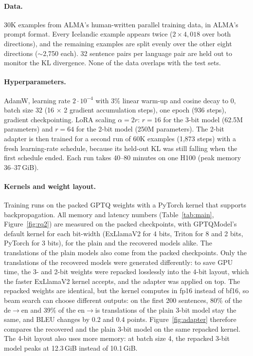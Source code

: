 \documentclass[10pt]{article}
\begin{document}
\paragraph{Data.} 30K examples from ALMA's human-written parallel training data,
in ALMA's prompt format. Every Icelandic example appears twice ($2\times4{,}018$
over both directions), and the remaining examples are split evenly over the
other eight directions ($\sim$2{,}750 each). 32 sentence pairs per language pair
are held out to monitor the KL divergence. None of the data overlaps with the
test sets.

\paragraph{Hyperparameters.} AdamW, learning rate $2\cdot10^{-4}$ with 3\%
linear warm-up and cosine decay to 0, batch size 32 (16 $\times$ 2 gradient
accumulation steps), one epoch (936 steps), gradient checkpointing. LoRA scaling
$\alpha=2r$: $r=16$ for the 3-bit model (62.5M parameters) and $r=64$ for the
2-bit model (250M parameters). The 2-bit adapter is then trained for a second
run of 60K examples (1{,}873 steps) with a fresh learning-rate schedule, because
its held-out KL was still falling when the first schedule ended. Each run takes
40--80 minutes on one H100 (peak memory 36--37\,GiB).

\paragraph{Kernels and weight layout.} Training runs on the packed GPTQ weights
with a PyTorch kernel that supports backpropagation. All memory and latency
numbers (Table~\ref{tab:main}, Figure~\ref{fig:rq2}) are measured on the packed
checkpoints, with GPTQModel's default kernel for each bit-width (ExLlamaV2 for
4 bits, Triton for 8 and 2 bits, PyTorch for 3 bits), for the plain and the
recovered models alike. The translations of the plain models also come from the
packed checkpoints. Only the translations of the recovered models were generated
differently: to save GPU time, the 3- and 2-bit weights were repacked losslessly
into the 4-bit layout, which the faster ExLlamaV2 kernel accepts, and the
adapter was applied on top. The repacked weights are identical, but the kernel
computes in fp16 instead of bf16, so beam search can choose different outputs:
on the first 200 sentences, 80\% of the de$\rightarrow$en and 39\% of the
en$\rightarrow$is translations of the plain 3-bit model stay the same, and BLEU
changes by 0.2 and 0.4 points. Figure~\ref{fig:adapter} therefore compares the
recovered and the plain 3-bit model on the same repacked kernel. The 4-bit layout
also uses more memory: at batch size 4, the repacked 3-bit model peaks at
12.3\,GiB instead of 10.1\,GiB.
\end{document}
